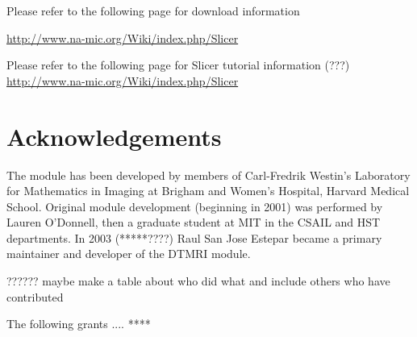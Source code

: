 \documentclass{InsightArticle}
\begin{document}
Please refer to the following page for download information

\url{http://www.na-mic.org/Wiki/index.php/Slicer}

Please refer to the following page for Slicer tutorial information
(???)
\url{http://www.na-mic.org/Wiki/index.php/Slicer}

\section{Acknowledgements}
The module has been developed by members of Carl-Fredrik Westin's
Laboratory for Mathematics in Imaging at Brigham and Women's Hospital,
Harvard Medical School.  Original module development (beginning in
2001) was performed by Lauren O'Donnell, then a graduate student at
MIT in the CSAIL and HST departments.  In 2003 (*****????)  Raul San
Jose Estepar became a primary maintainer and developer of the DTMRI module.

??????  maybe make a table about who did what and include others who have contributed

The following grants .... ****



%
%



\end{document}
